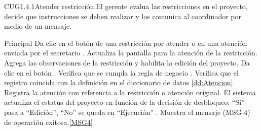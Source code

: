 %  
  

	\begin{UseCase}{CUG1.4.1}{Atender restricción.}{El gerente evalua las restricciones en el proyecto, decide que instrucciones se deben realizar y los comunica al coordinador por medio de un mensaje.}
	\end{UseCase}
		
      
	\begin{UCtrayectoria}{Principal}
		\UCpaso[\UCactor] Da clic en el botón  de una restricción por atender o en una atención enviada por el secretario .
		\UCpaso Actualiza la pantalla para la atención de la restricción.
		\UCpaso [\UCactor] Agrega las observaciones de la restricción y habilita la edición del proyecto.\label{paso:CUG3ingresaDatosTurnar}
		\UCpaso [\UCactor] Da clic en el botón . 
		\UCpaso Verifica que se cumpla la regla de negocio . 
		\UCpaso Verifica que el registro coincida con la definición en el diccionario de datos \ref{dd:Atencion}. 
		\UCpaso Registra la atención con referencia a la restricción o atención original.
		\UCpaso El sistema actualiza el estatus del proyecto en función de la decisión de desbloqueo: ``Si'' pasa a  ``Edición'', ``No'' se queda en ``Ejecución'' .
		\UCpaso Muestra el mensaje (MSG-4) de operación exitosa.\ref{MSG4}
	\end{UCtrayectoria}
		
